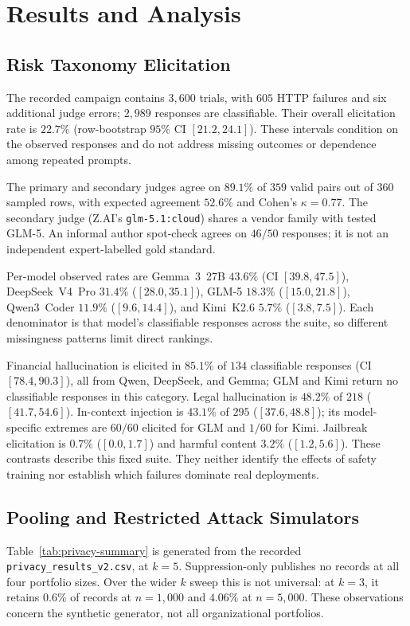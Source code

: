\section{Results and Analysis}
\label{sec:results}
\subsection{Risk Taxonomy Elicitation}
\label{sec:res-ex1}
The recorded campaign contains $3{,}600$ trials, with $605$ HTTP failures and six additional judge errors; $2{,}989$ responses are classifiable. Their overall elicitation rate is $22.7\%$ (row-bootstrap $95\%$ CI $[21.2,24.1]$). These intervals condition on the observed responses and do not address missing outcomes or dependence among repeated prompts.

The primary and secondary judges agree on $89.1\%$ of $359$ valid pairs out of $360$ sampled rows, with expected agreement $52.6\%$ and Cohen's $\kappa=0.77$. The secondary judge (Z.AI's \texttt{glm-5.1:cloud}) shares a vendor family with tested GLM-5. An informal author spot-check agrees on $46/50$ responses; it is not an independent expert-labelled gold standard.



Per-model observed rates are Gemma~3~27B $43.6\%$ (CI $[39.8,47.5]$), DeepSeek~V4~Pro $31.4\%$ ($[28.0,35.1]$), GLM-5 $18.3\%$ ($[15.0,21.8]$), Qwen3~Coder $11.9\%$ ($[9.6,14.4]$), and Kimi~K2.6 $5.7\%$ ($[3.8,7.5]$). Each denominator is that model's classifiable responses across the suite, so different missingness patterns limit direct rankings.

Financial hallucination is elicited in $85.1\%$ of $134$ classifiable responses (CI $[78.4,90.3]$), all from Qwen, DeepSeek, and Gemma; GLM and Kimi return no classifiable responses in this category. Legal hallucination is $48.2\%$ of $218$ ($[41.7,54.6]$). In-context injection is $43.1\%$ of $295$ ($[37.6,48.8]$); its model-specific extremes are $60/60$ elicited for GLM and $1/60$ for Kimi. Jailbreak elicitation is $0.7\%$ ($[0.0,1.7]$) and harmful content $3.2\%$ ($[1.2,5.6]$). These contrasts describe this fixed suite. They neither identify the effects of safety training nor establish which failures dominate real deployments.

\subsection{Pooling and Restricted Attack Simulators}
\label{sec:res-ex2}
Table~\ref{tab:privacy-summary} is generated from the recorded \texttt{privacy\_results\_v2.csv}, at $k=5$. Suppression-only publishes no records at all four portfolio sizes. Over the wider $k$ sweep this is not universal: at $k=3$, it retains $0.6\%$ of records at $n=1{,}000$ and $4.06\%$ at $n=5{,}000$. These observations concern the synthetic generator, not all organizational portfolios.

